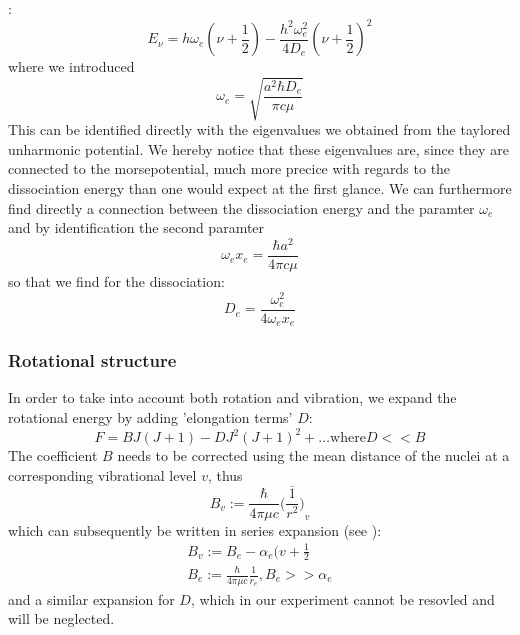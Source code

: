 \cite{fliessbach2008quantenmechanik}:
\begin{equation}
    E_\nu = h \omega_{e} \left( \nu + \frac{1}{2}
        \right) - \frac{h^2 \omega_{e}^2}{4 D_e} 
    \left( \nu + \frac{1}{2} \right)^2
\end{equation}
where we introduced
\begin{equation}
    \omega_{e} = \sqrt{\frac{a^2 \hbar D_e}{\pi c \mu}}
\end{equation}
This can be identified directly with the eigenvalues we obtained
from the taylored unharmonic potential. We hereby notice that these
eigenvalues are, since they are connected to the morsepotential,
much more precice with regards to the dissociation energy than
one would expect at the first glance. We can furthermore
find directly a connection between the dissociation energy and 
the paramter $\omega_e$ and by identification the second
paramter
\begin{equation}
    \omega_e x_e = \frac{\hbar a^2}{4\pi c \mu}
\end{equation}
so that we find for the dissociation:
\begin{equation}
    D_e = \frac{\omega_e^2}{4 \omega_e x_e}
\end{equation}
\clearpage


\subsubsection{Rotational structure}
In order to take into account both rotation and vibration, we expand 
the rotational energy by adding 'elongation terms' $D$:
\begin{equation}
    F = B J (J + 1) - D J^2 (J + 1)^2 + \ldots \mathrm{where} D << B
\end{equation}
The coefficient $B$ needs to be corrected using the mean distance of 
the nuclei at a corresponding vibrational level $v$, thus 
\begin{equation}
    B_v := \frac{\hbar}{4 \pi \mu c} \overline{\Big( \frac{1}{r^2}\Big)}_v
\end{equation}
which can subsequently be written in series expansion 
(see \cite{herzberg1950spectra}):
\begin{eqnarray}
    B_v := B_e - \alpha_e(v + \frac{1}{2} \\
    B_e := \frac{\hbar}{4 \pi \mu c} \frac{1}{r_e}, B_e >> \alpha_e
\end{eqnarray}
and a similar expansion for $D$, which in our experiment cannot be resovled 
and will be neglected.

